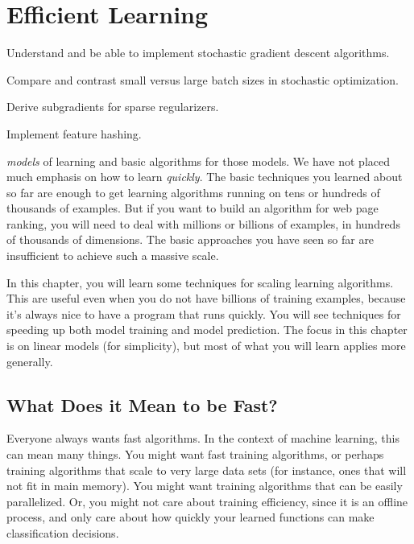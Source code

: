 \chapter{Efficient Learning} \label{sec:opt}


\begin{learningobjectives}
\item Understand and be able to implement stochastic gradient descent
  algorithms.
\item Compare and contrast small versus large batch sizes in
  stochastic optimization.
\item Derive subgradients for sparse regularizers.
\item Implement feature hashing.
\end{learningobjectives}

\dependencies{}

 \emph{models} of learning
and basic algorithms for those models.  We have not placed much
emphasis on how to learn \emph{quickly}.  The basic techniques you
learned about so far are enough to get learning algorithms running on
tens or hundreds of thousands of examples.  But if you want to build
an algorithm for web page ranking, you will need to deal with millions
or billions of examples, in hundreds of thousands of dimensions.  The
basic approaches you have seen so far are insufficient to achieve such
a massive scale.

In this chapter, you will learn some techniques for scaling learning
algorithms.  This are useful even when you do not have billions of
training examples, because it's always nice to have a program that
runs quickly.  You will see techniques for speeding up both model
training and model prediction.  The focus in this chapter is on linear
models (for simplicity), but most of what you will learn applies more
generally.

\section{What Does it Mean to be Fast?}

Everyone always wants fast algorithms.  In the context of machine
learning, this can mean many things.  You might want fast training
algorithms, or perhaps training algorithms that scale to very large
data sets (for instance, ones that will not fit in main memory).  You
might want training algorithms that can be easily parallelized.  Or,
you might not care about training efficiency, since it is an offline
process, and only care about how quickly your learned functions can
make classification decisions.

